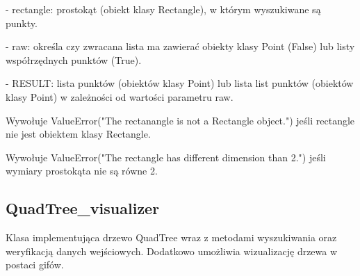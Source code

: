 \documentclass{lab}
\begin{document}
\begin{itemize}
  - rectangle: prostokąt (obiekt klasy Rectangle), w którym wyszukiwane są punkty.

  - raw: określa czy zwracana lista ma zawierać obiekty klasy Point (False) lub listy współrzędnych punktów (True).

  - RESULT: lista punktów (obiektów klasy Point) lub lista list punktów (obiektów klasy Point) w zależności od wartości parametru raw.

  Wywołuje ValueError("The rectanangle is not a Rectangle object.") jeśli rectangle nie jest obiektem klasy Rectangle.

  Wywołuje ValueError("The rectangle has different dimension than 2.") jeśli wymiary prostokąta nie są równe 2.
\end{itemize}

\subsection{QuadTree\_visualizer}
Klasa implementująca drzewo QuadTree wraz z metodami wyszukiwania oraz weryfikacją danych wejściowych. Dodatkowo umożliwia wizualizację drzewa w postaci gifów.
\end{document}
